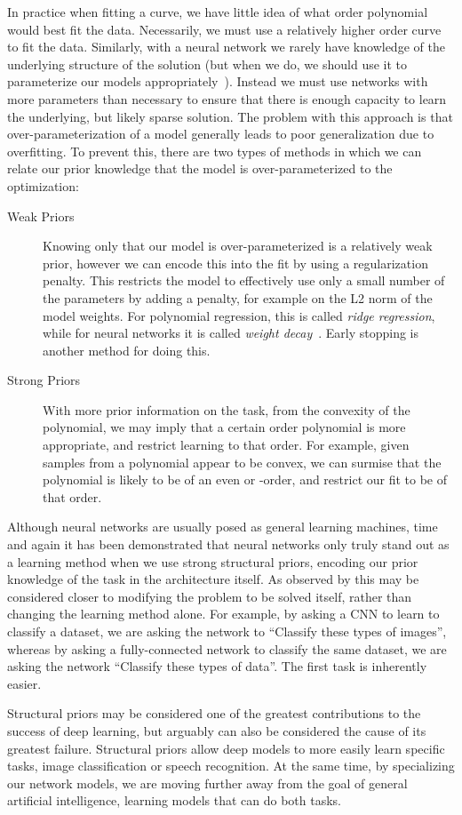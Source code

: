 \documentclass[thesis]{subfiles}
\begin{document}
	In practice when fitting a curve, we have little idea of what order polynomial would best fit the data. Necessarily, we must use a relatively higher order curve to fit the data. Similarly, with a neural network we rarely have knowledge of the underlying structure of the solution (but when we do, we should use it to parameterize our models appropriately~\citep{jain2016structural}). Instead we must use networks with more parameters than necessary to ensure that there is enough capacity to learn the underlying, but likely sparse solution. The problem with this approach is that over-parameterization of a model generally leads to poor generalization due to overfitting. To prevent this, there are two types of methods in which we can relate our prior knowledge that the model is over-parameterized to the optimization:
	\begin{description}
	\item[Weak Priors]
	Knowing only that our model is over-parameterized is a relatively weak prior, however we can encode this into the fit by using a regularization penalty. This restricts the model to effectively use only a small number of the parameters by adding a penalty, for example on the L2 norm of the model weights. For polynomial regression, this is called \emph{ridge regression}, while for neural networks it is called \emph{weight decay}~\cite{hinton1987learning}. Early stopping is another method for doing this.
	
	\item[Strong Priors]
	With more prior information on the task, \eg from the convexity of the polynomial, we may imply that a certain order polynomial is more appropriate, and restrict learning to that order. For example, given samples from a polynomial appear to be convex, we can surmise that the polynomial is likely to be of an even or -order, and restrict our fit to be of that order. 
    \end{description}
    
	Although neural networks are usually posed as general learning machines, time and again it has been demonstrated that neural networks only truly stand out as a learning method when we use strong structural priors, encoding our prior knowledge of the task in the architecture itself. As observed by \citet{denker1987large} this may be considered closer to modifying the problem to be solved itself, rather than changing the learning method alone. For example, by asking a CNN to learn to classify a dataset, we are asking the network to ``Classify these types of images'', whereas by asking a fully-connected network to classify the same dataset, we are asking the network ``Classify these types of data''. The first task is inherently easier.

    Structural priors may be considered one of the greatest contributions to the success of deep learning, but arguably can also be considered the cause of its greatest failure. Structural priors allow deep models to more easily learn specific tasks, \eg image classification or speech recognition. At the same time, by specializing our network models, we are moving further away from the goal of general artificial intelligence, \ie learning models that can do both tasks.
    
    
    
\end{document}
